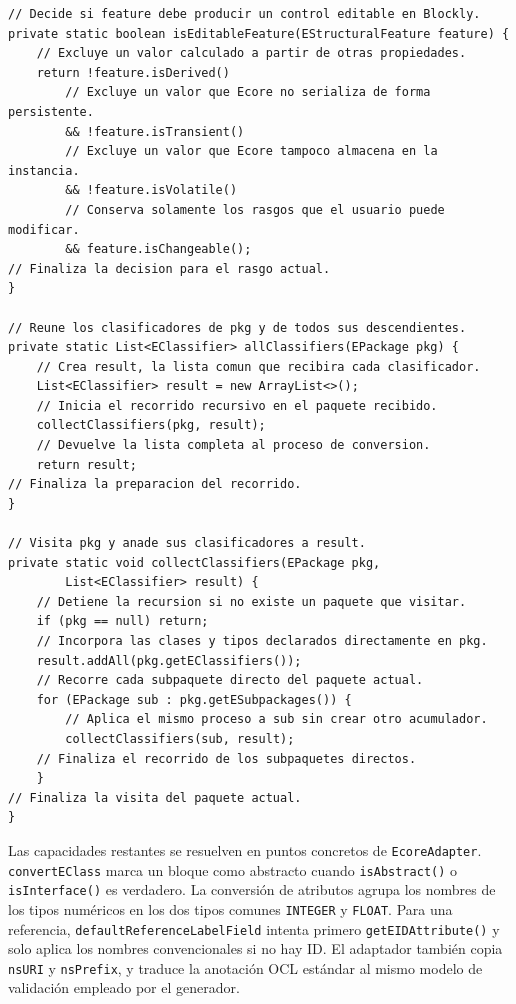 \begin{lstlisting}[style=tfmjavaecore, captionpos=t, caption={Filtrado de rasgos editables y recorrido de subpaquetes Ecore}, label={lst:ecore-filter-subpackages}]
// Decide si feature debe producir un control editable en Blockly.
private static boolean isEditableFeature(EStructuralFeature feature) {
    // Excluye un valor calculado a partir de otras propiedades.
    return !feature.isDerived()
        // Excluye un valor que Ecore no serializa de forma persistente.
        && !feature.isTransient()
        // Excluye un valor que Ecore tampoco almacena en la instancia.
        && !feature.isVolatile()
        // Conserva solamente los rasgos que el usuario puede modificar.
        && feature.isChangeable();
// Finaliza la decision para el rasgo actual.
}

// Reune los clasificadores de pkg y de todos sus descendientes.
private static List<EClassifier> allClassifiers(EPackage pkg) {
    // Crea result, la lista comun que recibira cada clasificador.
    List<EClassifier> result = new ArrayList<>();
    // Inicia el recorrido recursivo en el paquete recibido.
    collectClassifiers(pkg, result);
    // Devuelve la lista completa al proceso de conversion.
    return result;
// Finaliza la preparacion del recorrido.
}

// Visita pkg y anade sus clasificadores a result.
private static void collectClassifiers(EPackage pkg,
        List<EClassifier> result) {
    // Detiene la recursion si no existe un paquete que visitar.
    if (pkg == null) return;
    // Incorpora las clases y tipos declarados directamente en pkg.
    result.addAll(pkg.getEClassifiers());
    // Recorre cada subpaquete directo del paquete actual.
    for (EPackage sub : pkg.getESubpackages()) {
        // Aplica el mismo proceso a sub sin crear otro acumulador.
        collectClassifiers(sub, result);
    // Finaliza el recorrido de los subpaquetes directos.
    }
// Finaliza la visita del paquete actual.
}
\end{lstlisting}

Las capacidades restantes se resuelven en puntos concretos de
\texttt{EcoreAdapter}. \texttt{convertEClass} marca un bloque como abstracto
cuando \texttt{isAbstract()} o \texttt{isInterface()} es verdadero. La
conversión de atributos agrupa los nombres de los tipos numéricos en los dos
tipos comunes \texttt{INTEGER} y \texttt{FLOAT}. Para una referencia,
\texttt{defaultReferenceLabelField} intenta primero
\texttt{getEIDAttribute()} y solo aplica los nombres convencionales si no hay
ID. El adaptador también copia \texttt{nsURI} y \texttt{nsPrefix}, y traduce
la anotación OCL estándar al mismo modelo de validación empleado por el
generador.

